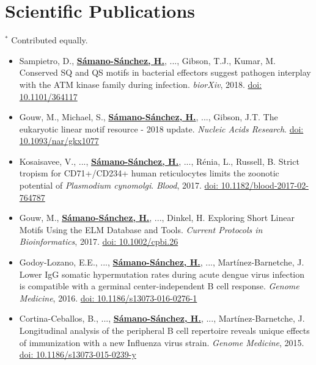 \documentclass[11pt,a4paper,sans]{moderncv} %
\begin{document}
\section{Scientific Publications}
\vspace{-.1cm}
\footnotesize{$^{\ast}$ Contributed equally.} \hspace{.5cm}
\vspace{.1cm}
\begin{itemize}
  \item Sampietro, D., \textbf{\underline{S\'amano-S\'anchez, H.}}, ..., Gibson, T.J., Kumar, M. Conserved SQ and QS motifs in bacterial effectors suggest pathogen interplay with the ATM kinase family during infection. \textit{biorXiv}, 2018. \href{https://doi.org/10.1101/364117}{doi: 10.1101/364117}
  \item Gouw, M., Michael, S., \textbf{\underline{S\'amano-S\'anchez, H.}}, ..., Gibson, J.T. The eukaryotic linear motif resource - 2018 update. \textit{Nucleic Acids Research}. \href{https://doi.org/10.1093/nar/gkx1077}{doi: 10.1093/nar/gkx1077}
  \item Kosaisavee, V., ..., \textbf{\underline{S\'amano-S\'anchez, H.}}, ..., R\'enia, L., Russell, B. Strict tropism for CD71+/CD234+ human reticulocytes limits the zoonotic potential of \textit{Plasmodium cynomolgi}. \textit{Blood}, 2017. \href{https://doi.org/10.1182/blood-2017-02-764787}{doi: 10.1182/blood-2017-02-764787}
  \item Gouw, M., \textbf{\underline{S\'amano-S\'anchez, H.}}, ..., Dinkel, H. Exploring Short Linear Motifs Using the ELM Database and Tools. \textit{Current Protocols in Bioinformatics}, 2017. \href{https://doi.org/10.1002/cpbi.26}{doi: 10.1002/cpbi.26}
  \item Godoy-Lozano, E.E., ..., \textbf{\underline{S\'amano-S\'anchez, H.}}, ..., Mart\'inez-Barnetche, J. Lower IgG somatic hypermutation rates during acute dengue virus infection is compatible with a germinal center-independent B cell response. \textit{Genome Medicine}, 2016. \href{https://doi.org/10.1186/s13073-016-0276-1}{doi: 10.1186/s13073-016-0276-1}
  \item Cortina-Ceballos, B., ..., \textbf{\underline{S\'amano-S\'anchez, H.}}, ..., Mart\'inez-Barnetche, J. Longitudinal analysis of the peripheral B cell repertoire reveals unique effects of immunization with a new Influenza virus strain. \textit{Genome Medicine}, 2015. \href{https://doi.org/10.1186/s13073-015-0239-y}{doi: 10.1186/s13073-015-0239-y}

\end{itemize}
\end{document}
